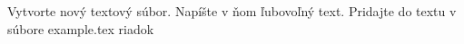 Vytvorte nový textový súbor. Napíšte v ňom ľubovoľný text. Pridajte do textu v súbore example.tex riadok